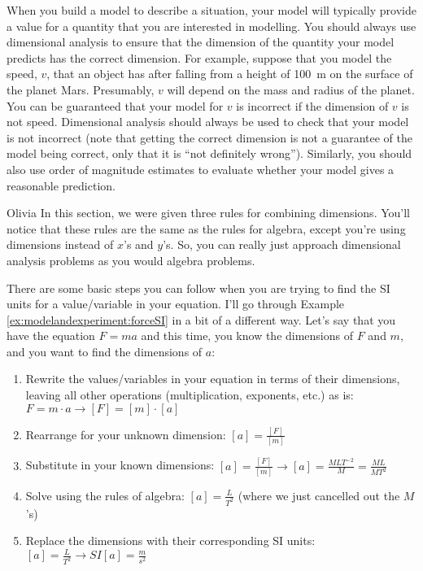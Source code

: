 When you build a model to describe a situation, your model will typically provide a value for a quantity that you are interested in modelling. You should always use dimensional analysis to ensure that the dimension of the quantity your model predicts has the correct dimension. For example, suppose that you model the speed, $v$, that an object has after falling from a height of \SI{100}{\meter} on the surface of the planet Mars. Presumably, $v$ will depend on the mass and radius of the planet. You can be guaranteed that your model for $v$ is incorrect if the dimension of $v$ is not speed. Dimensional analysis should always be used to check that your model is not incorrect (note that getting the correct dimension is not a guarantee of the model being correct, only that it is ``not definitely wrong''). Similarly, you should also use order of magnitude estimates to evaluate whether your model gives a reasonable prediction.

\begin{studentOpinion}{Olivia}
In this section, we were given three rules for combining dimensions. You'll notice that these rules are the same as the rules for algebra, except you're using dimensions instead of $x$'s and $y$'s. So, you can really just approach dimensional analysis problems as you would algebra problems.

There are some basic steps you can follow when you are trying to find the SI units for a value/variable in your equation. I'll go through Example \ref{ex:modelandexperiment:forceSI} in a bit of a different way. Let's say that you have the equation $F=ma$ and this time, you know the dimensions of $F$ and $m$, and you want to find the dimensions of $a$:
\begin{enumerate}[itemsep=1ex]
\item Rewrite the values/variables in your equation in terms of their dimensions, leaving all other operations (multiplication, exponents, etc.) as is: $F=m\cdot a\rightarrow [F]=[m]\cdot[a]$
\item Rearrange for your unknown dimension: $[a]=\frac{[F]}{[m]}$
\item Substitute in your known dimensions: $[a]=\frac{[F]}{[m]} \rightarrow [a]=\frac{MLT^{-2}}{M}=\frac{ML}{MT^2}$
\item Solve using the rules of algebra: $[a]=\frac{L}{T^2}$ (where we just cancelled out the $M$'s)
\item Replace the dimensions with their corresponding SI units: $[a]=\frac{L}{T^2}\rightarrow SI[a]=\frac{m}{s^2}$
\end{enumerate}
\end{studentOpinion}

